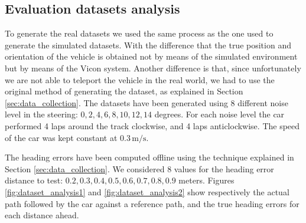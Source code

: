 \documentclass[a4paper,12pt,sort&compress]{article}
\begin{document}


\subsection{Evaluation datasets analysis}
To generate the real datasets we used the same process as the one used to generate the simulated
datasets. With the difference that the true position and orientation of the vehicle is obtained not
by means of the simulated environment but by means of the Vicon system. Another difference is that,
since unfortunately we are not able to teleport the vehicle in the real world, we had to use the
original method of generating the dataset, as explained in Section \ref{sec:data_collection}. The
datasets have been generated using 8 different noise level in the steering: $0, 2, 4, 6, 8, 10, 12,
14$ degrees. For each noise level the car performed 4 laps around the track clockwise, and 4 laps
anticlockwise. The speed of the car was kept constant at $0.3\,\si{\meter\per\second}$. 

The heading errors have been computed offline using the technique explained in Section
\ref{sec:data_collection}. We considered 8 values for the heading error distance to test: $0.2, 0.3,
0.4, 0.5, 0.6, 0.7, 0.8, 0.9$ meters.
Figures \ref{fig:dataset_analysis1} and \ref{fig:dataset_analysis2} show respectively the actual path followed by
the car against a reference path, and the true heading errors for each distance ahead.  %
\end{document}
